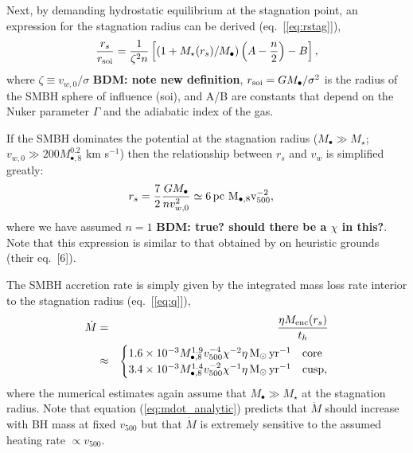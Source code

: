 \documentclass[usenatbib,fleqn]{mn2e}
\newcommand{\rs}{r_s}
\newcommand{\pc}{\rm pc}
\newcommand{\Menc}{M_{\rm enc}}
\newcommand{\Mstar}{M_{\star}}
\newcommand{\Mbh}[1][]{M_{\bullet#1}}
\newcommand{\Mbheight}{M_{\bullet,8}}
\newcommand{\soi}{\rm soi}
\newcommand{\rsoi}{r_{\soi}}
\newcommand{\vwO}{v_{w,0}}
\newcommand{\x}{\frac{r_s}{\rsoi}}
\newcommand{\pyear}{{\rm yr}^{-1}}
\renewcommand{\th}{t_h}
\begin{document}
Next, by demanding hydrostatic equilibrium at the stagnation point, an expression for the stagnation radius can be derived (eq.~[\ref{eq:rstag}]),
\begin{align}
  \x=\frac{1}{\zeta^2 n}\left[ (1+\Mstar(\rs)/\Mbh)\left(A-\frac{n}{2}\right)-B\right],
  \label{eq:stag_analytic}
\end{align}
where $\zeta \equiv v_{w,0}/\sigma$ {\bf BDM: note new definition}, $r_{\rm soi} = GM_{\bullet}/\sigma^{2}$ is the radius of the SMBH sphere of influence (soi), and A/B are constants that depend on the Nuker parameter $\Gamma$ and the adiabatic index of the gas.  

If the SMBH dominates the potential at the stagnation radius ($M_{\bullet} \gg M_{\star}$; $v_{w,0} \gg 200 M_{\bullet,8}^{0.2}$ km s$^{-1}$) then the relationship between $\rs$ and $v_{w}$ is simplified greatly:
\begin{align}
  &\rs=\frac{7}{2}\frac{G \Mbh}{n \vwO^2} \simeq 6 \, \pc \,\, \Mbheight v_{500}^{-2},
  \label{eq:stag_simple}
\end{align}
where we have assumed $n = 1$ {\bf BDM: true?  should there be a $\chi$ in this?}.  Note that this expression is similar to that obtained by \citet{Volonteri+11} on heuristic grounds (their eq.~[6]).

The SMBH accretion rate is simply given by the integrated mass loss rate interior to the stagnation radius (eq.~[\ref{eq:q}]), 
\begin{eqnarray}
  \dot{M} &=& \frac{\eta \Menc(\rs)}{\th} \nonumber \\
&\approx&
  \begin{cases}
    1.6 \times 10^{-3}  M_{\bullet,8}^{1.9}
    v_{500}^{-4} \chi^{-2} \eta \Msun \, \pyear& \text{core} \\
    3.4 \times 10^{-3} \Mbheight^{1.4}
    v_{500}^{-2} \chi^{-1} \eta \Msun \, \pyear  & \text{cusp}, 
  \end{cases}
  \label{eq:mdot_analytic}
\end{eqnarray}
where the numerical estimates again assume that $M_{\bullet} \gg M_{\star}$ at the stagnation radius.  Note that equation (\ref{eq:mdot_analytic}) predicts that $\dot{M}$ should increase with BH mass at fixed $v_{500}$ but that $\dot{M}$ is extremely sensitive to the assumed heating rate $\propto v_{500}$.
\end{document}
